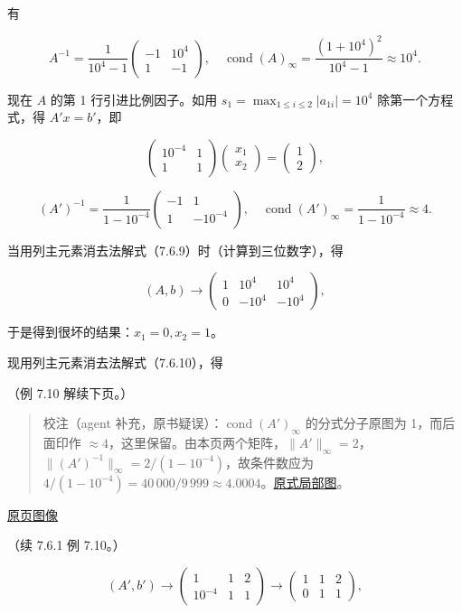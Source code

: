\documentclass[
  10pt,
  fontset=fandol]{ctexart}
\begin{document}
有

\[
A^{-1}=\frac1{10^4-1}\begin{pmatrix}-1&10^4\\1&-1\end{pmatrix},\quad
\operatorname{cond}(A)_\infty=\frac{(1+10^4)^2}{10^4-1}\approx10^4.
\]

现在 \(A\) 的第 1 行引进比例因子。如用 \(s_1=\max_{1\leqslant i\leqslant2}|a_{1i}|=10^4\) 除第一个方程式，得 \(A'x=b'\)，即

\[
\begin{pmatrix}10^{-4}&1\\1&1\end{pmatrix}
\begin{pmatrix}x_1\\x_2\end{pmatrix}
=\begin{pmatrix}1\\2\end{pmatrix},
\tag{7.6.10}
\]

\[
(A')^{-1}=\frac1{1-10^{-4}}\begin{pmatrix}-1&1\\1&-10^{-4}\end{pmatrix},\quad
\operatorname{cond}(A')_\infty=\frac1{1-10^{-4}}\approx4.
\]

当用列主元素消去法解式（7.6.9）时（计算到三位数字），得

\[
(A,b)\longrightarrow
\left(\begin{array}{cc|c}
1&10^4&10^4\\
0&-10^4&-10^4
\end{array}\right),
\]

于是得到很坏的结果：\(x_1=0,x_2=1\)。

现用列主元素消去法解式（7.6.10），得

（例 7.10 解续下页。）

\begin{quote}
校注（agent 补充，原书疑误）：\(\operatorname{cond}(A')_\infty\) 的分式分子原图为 1，而后面印作 \(\approx4\)，这里保留。由本页两个矩阵，\(\|A'\|_\infty=2\)，\(\|(A')^{-1}\|_\infty=2/(1-10^{-4})\)，故条件数应为 \(4/(1-10^{-4})=40\,000/9\,999\approx4.0004\)。\href{../assets/ch07b/209-scaled-cond.png}{原式局部图}。
\end{quote}

\href{../../source-images/pdf-210.jpeg}{原页图像}

（续 7.6.1 例 7.10。）

\[
(A',b')\longrightarrow
\left(\begin{array}{cc|c}1&1&2\\10^{-4}&1&1\end{array}\right)
\longrightarrow
\left(\begin{array}{cc|c}1&1&2\\0&1&1\end{array}\right),
\]
\end{document}
